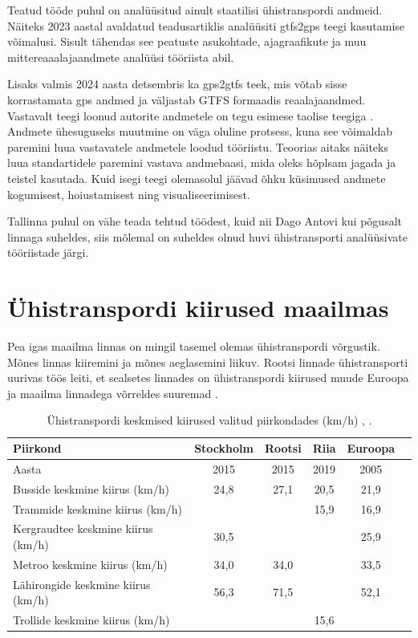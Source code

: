 Teatud tööde puhul on analüüsitud ainult staatilisi ühistranspordi andmeid. Näiteks 2023 aastal avaldatud teadusartiklis \cite{2024_pt_g2viz} analüüsiti gtfs2gps teegi kasutamise võimalusi. Sisult tähendas see peatuste asukohtade, ajagraafikute ja muu mittereaaalajaandmete analüüsi tööriista abil.

Lisaks valmis 2024 aasta detsembris ka gps2gtfs teek, mis võtab sisse korrastamata gps andmed ja väljastab GTFS formaadis reaalajaandmed. Vastavalt teegi loonud autorite andmetele on tegu esimese taolise teegiga \cite{GPS_2_GTFS}. Andmete ühesuguseks muutmine on väga oluline protsess, kuna see võimaldab paremini luua vastavatele andmetele loodud tööriistu. Teoorias aitaks näiteks luua standartidele paremini vastava andmebaasi, mida oleks hõplsam jagada ja teistel kasutada. Kuid isegi teegi olemasolul jäävad õhku küsimused andmete kogumisest, hoiustamisest ning visualiseerimisest.

Tallinna puhul on vähe teada tehtud töödest, kuid nii Dago Antovi kui põgusalt linnaga suheldes, siis mõlemal on suheldes olnud huvi ühistransporti analüüsivate tööriistade järgi.

\section{Ühistranspordi kiirused maailmas}

Pea igas maailma linnas on mingil tasemel olemas ühistranspordi võrgustik. Mõnes linnas kiiremini  ja mõnes aeglasemini liikuv. Rootsi linnade ühistransporti uurivas töös leiti, et sealsetes linnades on ühistranspordi kiirused muude Euroopa ja maailma linnadega võrreldes suuremad \cite{urbansci3010025}. 

\begin{longtable}{|l|c|c|c|c|c|}
\caption{Ühistranspordi keskmised kiirused valitud piirkondades (km/h) \cite{rigas_satiksme_passengers_2019}, \cite{urbansci3010025}.}
\label{tab:maailmaKiirused}\\ \hline %
\textbf{Piirkond} & \textbf{Stockholm} & \textbf{Rootsi}  & \textbf{Riia} & \textbf{Euroopa} \\ \hline
Aasta & 2015 & 2015 & 2019 & 2005 \\
\hline
Busside keskmine kiirus (km/h) & 24,8 & 27,1 & 20,5 & 21,9 \\ \hline
Trammide keskmine kiirus (km/h) &   &   & 15,9  & 16,9 \\ \hline
Kergraudtee keskmine kiirus (km/h) & 30,5 &   &   & 25,9 \\ \hline
Metroo keskmine kiirus (km/h) & 34,0 & 34,0 &    & 33,5 \\ \hline
Lähirongide keskmine kiirus (km/h) & 56,3 & 71,5 &    & 52,1 \\ \hline
Trollide keskmine kiirus (km/h) &   &   & 15,6  &   \\
\hline
\end{longtable}


